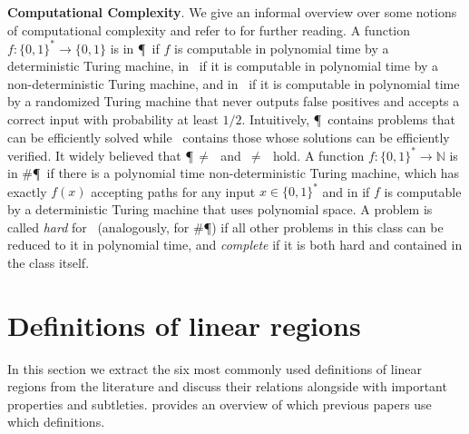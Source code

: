 \documentclass{article}
\renewcommand{\paragraph}[1]{\textbf{#1}.}
\begin{document}
\paragraph{Computational Complexity}
We give an informal overview over some notions of computational complexity and refer to \citep{arora2009computational} for further reading.
A function $f:\{0,1\}^*\to \{0,1\}$ is in \P\ if $f$ is computable in polynomial time by a deterministic Turing machine, in \NP\ if it is computable in polynomial time by a non-deterministic Turing machine, and in \RP\ if it is computable in polynomial time by a randomized Turing machine that never outputs false positives and accepts a correct input with probability at least $1/2$.
Intuitively, \P\ contains problems that can be efficiently solved while \NP\ contains those whose solutions can be efficiently verified.
It widely believed that \P\,$\neq$\,\NP\ and \RP\,$\neq$\,\NP\ hold.
A function $f:\{0,1\}^*\to \mathbb{N}$ is in \#\P\ if there is a polynomial time non-deterministic Turing machine, which has exactly $f(x)$ accepting paths for any input $x\in \{0,1\}^*$ and in \FP\SPACE{} if $f$ is computable by a deterministic Turing machine that uses polynomial space.
A problem is called \emph{hard} for \NP\ (analogously, for \#\P) if all other problems in this class can be reduced to it in polynomial time, and \emph{complete} if it is both hard and contained in the class itself.

\section{Definitions of linear regions}\label{sec:definitions}

In this section we extract the six most commonly used definitions of linear regions from the literature and discuss their relations alongside with important properties and subtleties.  provides an overview of which previous papers use which definitions.
\end{document}
